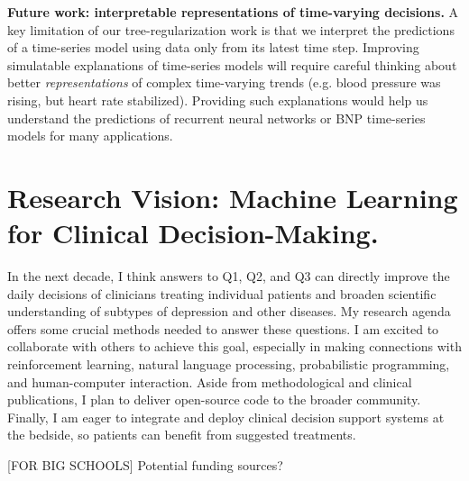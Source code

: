\documentclass[11pt,letterpaper]{article}
\begin{document}
\textbf{Future work: interpretable representations of time-varying decisions.}
A key limitation of our tree-regularization work is that we interpret the predictions of a time-series model using data only from its latest time step. Improving simulatable explanations of time-series models will require careful thinking about better \emph{representations} of complex time-varying trends (e.g. blood pressure was rising, but heart rate stabilized). Providing such explanations would help us understand the predictions of recurrent neural networks or BNP time-series models
for many applications.

\section*{Research Vision: Machine Learning for Clinical Decision-Making.}

In the next decade, I think answers to Q1, Q2, and Q3 can directly improve the daily decisions of clinicians treating individual patients and broaden scientific understanding of subtypes of depression and other diseases.
My research agenda offers some crucial methods needed to answer these questions.
I am excited to collaborate with others to achieve this goal, especially in making connections with reinforcement learning, natural language processing, probabilistic programming, and human-computer interaction.
Aside from methodological and clinical publications, 
I plan to deliver open-source code to the broader community. Finally, I am eager to integrate and deploy clinical decision support systems at the bedside, so patients can benefit from suggested treatments.

[FOR BIG SCHOOLS] Potential funding sources?


\renewcommand{\url}[1]
{\ifx#1\else\href{#1}{[PDF]}\fi}
{\scriptsize
\setlength{\bibsep}{1pt}

}
\end{document}
